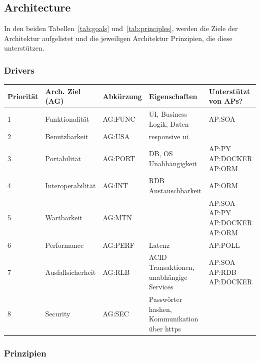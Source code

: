 \subsection{Architecture}

In den beiden Tabellen~\ref{tab:goals} und~\ref{tab:principles}, werden die Ziele der Architektur aufgelistet
und die jeweiligen Architektur Prinzipien, die diese unterstützen.

\subsubsection{Drivers}
\begin{center}
    \begin{tabular}{|l|l|l| p{5cm} |p{2.5cm}|}
        \hline
        \textbf{Priorität} & \textbf{Arch. Ziel (AG)} & \textbf{Abkürzung} & \textbf{Eigenschaften} & \textbf{Unterstützt von APs?} \\
        \hline
        1 & Funktionalität & AG:FUNC & UI, Business Logik, Daten & AP:SOA \\
        2 & Benutzbarkeit & AG:USA & responsive ui &  \\
        3 & Portabilität & AG:PORT & DB, OS Unabhängigkeit & AP:PY AP:DOCKER AP:ORM\\
        4 & Interoperabilität & AG:INT & RDB Austauschbarkeit & AP:ORM \\
        5 & Wartbarkeit & AG:MTN & & AP:SOA AP:PY AP:DOCKER AP:ORM\\
        6 & Performance & AG:PERF & Latenz & AP:POLL \\
        7 & Ausfallsicherheit & AG:RLB & ACID Transaktionen, unabhängige Services & AP:SOA AP:RDB AP:DOCKER\\
        8 & Security & AG:SEC & Passwörter hashen, Kommunikation über https &  \\
        \hline
    \end{tabular}
    \label{tab:goals}
\end{center}
\subsubsection{Prinzipien}

